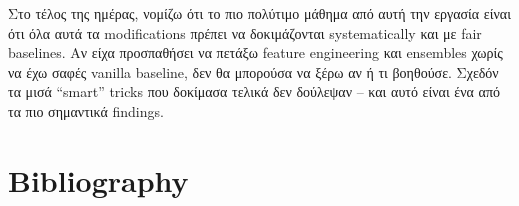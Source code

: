 \documentclass[12pt]{fphw}
\begin{document}
Στο τέλος της ημέρας, νομίζω ότι το πιο πολύτιμο μάθημα από αυτή την εργασία είναι ότι όλα αυτά τα modifications πρέπει να δοκιμάζονται systematically και με fair baselines. Αν είχα προσπαθήσει να πετάξω feature engineering και ensembles χωρίς να έχω σαφές vanilla baseline, δεν θα μπορούσα να ξέρω αν ή τι βοηθούσε. Σχεδόν τα μισά ``smart'' tricks που δοκίμασα τελικά δεν δούλεψαν -- και αυτό είναι ένα από τα πιο σημαντικά findings.

\section{Bibliography}



\end{document}
